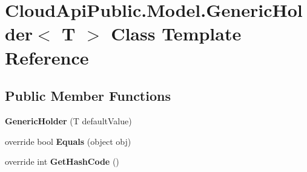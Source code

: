\hypertarget{class_cloud_api_public_1_1_model_1_1_generic_holder_3_01_t_01_4}{\section{Cloud\-Api\-Public.\-Model.\-Generic\-Holder$<$ T $>$ Class Template Reference}
\label{class_cloud_api_public_1_1_model_1_1_generic_holder_3_01_t_01_4}
}
\subsection*{Public Member Functions}
\begin{DoxyCompactItemize}
\item 
\hypertarget{class_cloud_api_public_1_1_model_1_1_generic_holder_3_01_t_01_4_a0b75a060f8a8cfb0e01ae5e8392bfa3d}{{\bfseries Generic\-Holder} (T default\-Value)}\label{class_cloud_api_public_1_1_model_1_1_generic_holder_3_01_t_01_4_a0b75a060f8a8cfb0e01ae5e8392bfa3d}

\item 
\hypertarget{class_cloud_api_public_1_1_model_1_1_generic_holder_3_01_t_01_4_a0ddde7395c09677e70eab74e6e8095cd}{override bool {\bfseries Equals} (object obj)}\label{class_cloud_api_public_1_1_model_1_1_generic_holder_3_01_t_01_4_a0ddde7395c09677e70eab74e6e8095cd}

\item 
\hypertarget{class_cloud_api_public_1_1_model_1_1_generic_holder_3_01_t_01_4_a11d9423e3e1f71456c3da8378f8cc84b}{override int {\bfseries Get\-Hash\-Code} ()}\label{class_cloud_api_public_1_1_model_1_1_generic_holder_3_01_t_01_4_a11d9423e3e1f71456c3da8378f8cc84b}

\end{DoxyCompactItemize}
